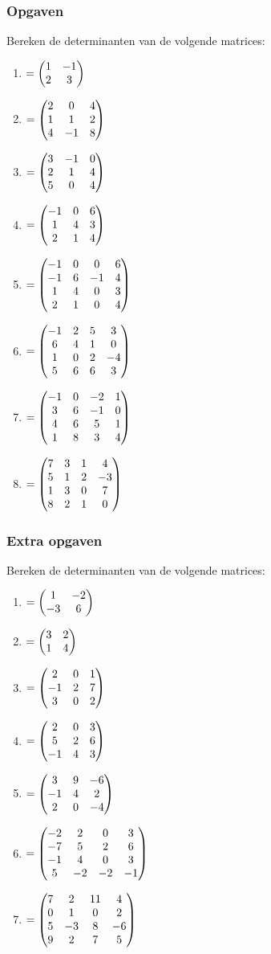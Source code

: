 \newpage 
\subsubsection{Opgaven}
Bereken de determinanten van de volgende matrices:\\
\begin{enumerate}[label=\Alph*]
	\item 
	$  = \begin{pmatrix} 1 & -1 \\  2 & 3 \end{pmatrix} $ \\
	\item 
	$  = \begin{pmatrix} 2 & 0 & 4 \\ 1 & 1 & 2 \\ 4 & -1 & 8 \end{pmatrix} $ \\
	\item 
	$  =  \begin{pmatrix} 3 & -1 & 0 \\ 2 & 1 & 4 \\ 5 & 0 & 4 \end{pmatrix} $ \\
	\item 
	$  =  \begin{pmatrix} -1 & 0 & 6 \\ 1 & 4 & 3 \\ 2 & 1 & 4 \end{pmatrix} $ \\ 
	\item 
	$   = \begin{pmatrix} -1 & 0 &  0 & 6 \\ -1 & 6 & -1 & 4 \\ 1 & 4 & 0 & 3 \\ 2 & 1 & 0 & 4 \end{pmatrix} $ \\
	\item 
	$  =  \begin{pmatrix} -1 & 2 &  5 & 3 \\ 6 & 4 & 1 & 0 \\ 1 & 0 & 2 & -4 \\ 5 & 6 & 6 & 3 \end{pmatrix} $ \\
	\item 
	$   = \begin{pmatrix} -1 & 0 &  -2 & 1 \\ 3 & 6 & -1 & 0 \\ 4 & 6 & 5 & 1 \\ 1 & 8 & 3 & 4 \end{pmatrix} $ \\
	\item 
	$  =  \begin{pmatrix} 7 & 3 &  1 & 4 \\ 5 & 1 & 2 & -3 \\ 1 & 3 & 0 & 7 \\ 8 & 2 & 1 & 0 \end{pmatrix} $
\end{enumerate}

\newpage
\subsubsection{Extra opgaven}
Bereken de determinanten van de volgende matrices:\\

\begin{enumerate}[label=\Alph*]
	\item 
	$   = \begin{pmatrix} 1 & -2 \\  -3 & 6 \end{pmatrix} $ \\ 
	\item 
	$  = \begin{pmatrix} 3 & 2  \\ 1 & 4  \end{pmatrix} $ \\
	\item 
	$ = \begin{pmatrix} 2 & 0 & 1 \\ -1 & 2 & 7 \\ 3 & 0 & 2 \end{pmatrix} $ \\
	\item  
	$  = \begin{pmatrix} 2 & 0 & 3 \\ 5 & 2 & 6 \\ -1 & 4 & 3 \end{pmatrix} $ \\  
	\item 
	$   = \begin{pmatrix} 3 & 9 &  -6  \\ -1 & 4 & 2  \\ 2 & 0 & -4  \end{pmatrix}
	$ \\
	\item 
	$  =  \begin{pmatrix} -2 & 2 &  0 & 3 \\ -7 & 5 & 2 & 6 \\ -1 & 4 & 0 & 3 \\ 5 & -2 & -2 & -1 \end{pmatrix} $ \\ 
	\item 
	$ = \begin{pmatrix} 7 & 2 &  11 & 4 \\ 0 & 1 & 0 & 2 \\ 5 & -3 & 8 & -6 \\ 9 & 2 & 7 & 5 \end{pmatrix} $
\end{enumerate}
